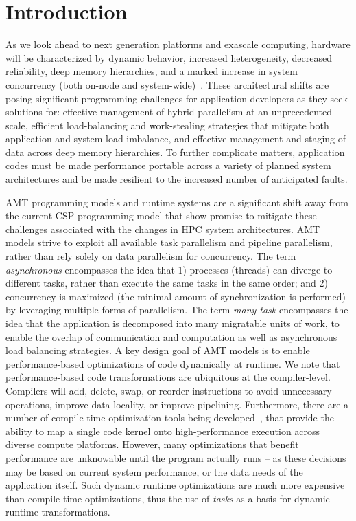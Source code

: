 \chapter{Introduction}
\label{chap:introduction}
As we look ahead to next generation platforms and exascale computing, hardware 
will be characterized by dynamic behavior, increased
heterogeneity, decreased reliability, deep memory hierarchies, and a marked increase in system
\gls{concurrency} (both on-node and system-wide)~\cite{doe_arch, dav_exascale}. 
These architectural shifts are posing significant programming challenges for
application developers as they seek solutions for: effective management of hybrid parallelism 
at an unprecedented scale,  efficient load-balancing and work-stealing
strategies that mitigate both application and system load imbalance, and effective management and
staging of data across deep memory hierarchies.  To further complicate matters,
application codes must be made performance portable across a variety of planned
system architectures and be made resilient to the increased number of anticipated faults.  

\gls{AMT} \glspl{programming model} and \glspl{runtime system} 
are a significant shift away from the current \gls{CSP} programming model that
show promise to mitigate these challenges associated with the changes in \gls{HPC} system architectures.  
\gls{AMT} models strive to exploit all available \gls{task parallelism} and
\gls{pipeline parallelism}, rather than rely solely on \gls{data parallelism}
for \gls{concurrency}. The term {\em \gls{asynchronous}} encompasses the idea that 
1) processes (threads) can diverge to different tasks, rather than execute 
the same tasks in the same order; and 2) \gls{concurrency} is maximized (the 
  minimal amount of synchronization is performed) by 
leveraging multiple forms of parallelism. The term {\em many-task} encompasses 
the idea that the application is decomposed into many 
\gls{migratable} units of work, to enable the overlap of communication and 
computation as well as asynchronous load balancing strategies.
A key design goal of \gls{AMT} models is to enable performance-based
optimizations of code dynamically at runtime.
We note that performance-based code transformations are ubiquitous at the compiler-level.
Compilers will add, delete, swap, or reorder instructions to avoid unnecessary operations, improve data locality, or improve pipelining.
Furthermore, there are a number of compile-time optimization tools being
developed~\cite{Kokkos,RAJA}, that provide the ability to map a
single code kernel onto high-performance execution across diverse compute platforms.
However, many optimizations that benefit performance are unknowable until the program
actually runs -- as these decisions may be based on current system performance,
or the data needs of the application itself. Such dynamic runtime optimizations are much more expensive 
than compile-time optimizations, thus the use of \emph{tasks} as a basis
for dynamic runtime transformations.

